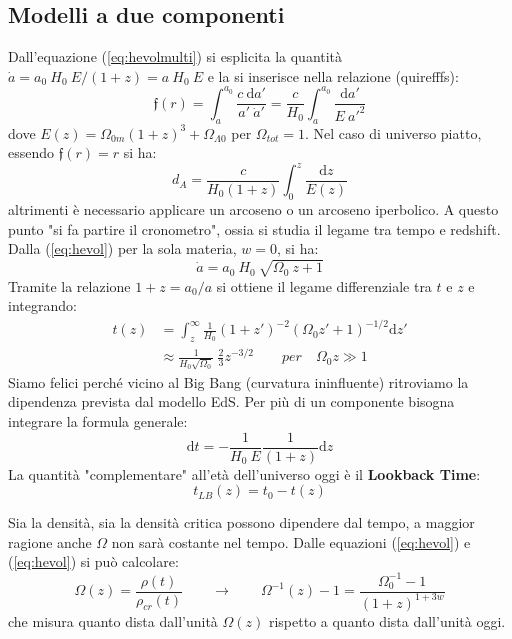 \subsection{Modelli a due componenti}
Dall'equazione (\ref{eq:hevolmulti}) si esplicita la quantità $\dot{a}=a_0 ~H_0 ~E /(1+z) = a ~H_0 ~E$ e la si inserisce nella relazione (quirefffs):
\begin{equation}
    \mathfrak{f}(r) = \int_{a}^{a_0} \frac{c ~\mathrm{d}a'}{a' ~\dot{a}'} = \frac{c}{H_0} \int_{a}^{a_0} \frac{\mathrm{d}a'}{E ~a'^2}
\end{equation}
dove $E(z) = \Omega_{0m}(1+z)^3 + \Omega_{\Lambda 0}$ per $\Omega_{tot}=1$. Nel caso di universo piatto, essendo $\mathfrak{f}(r)=r$ si ha:
\begin{equation}
    d_A = \frac{c}{H_0 (1+z)} \int^z_0 \frac{\mathrm{d}z}{E(z)}
\end{equation}
altrimenti è necessario applicare un arcoseno o un arcoseno iperbolico. A questo punto "si fa partire il cronometro", ossia si studia il legame tra tempo e redshift. Dalla (\ref{eq:hevol}) per la sola materia, $w=0$, si ha:
\begin{equation}
\dot{a}=a_0~H_0~\sqrt{\Omega_0 ~z +1} \label{eq:adotsolamateria}
\end{equation}
Tramite la relazione $1+z=a_0/a$ si ottiene il legame differenziale tra $t$ e $z$ e integrando:
\begin{align}
    t(z) &=\int_z^\infty \frac{1}{H_0}(1+z')^{-2}(\Omega_0 z'+1)^{-1/2}\mathrm{d}z' \\
    & \approx  \frac{1}{H_0 \sqrt{\Omega_0}}~\frac{2}{3} z^{-3/2} \qquad per\quad \Omega_0 z \gg 1
\end{align}
Siamo felici perché vicino al Big Bang (curvatura ininfluente) ritroviamo la dipendenza prevista dal modello EdS. Per più di un componente bisogna integrare la formula generale:
\begin{equation}
    \mathrm{d}t = - \frac{1}{H_0 ~E}\frac{1}{(1+z)}\mathrm{d}z
\end{equation}
La quantità "complementare" all'età dell'universo oggi è il \textbf{Lookback Time}:
$$
t_{LB}(z) = t_0 - t(z)
$$

Sia la densità, sia la densità critica possono dipendere dal tempo, a maggior ragione anche $\Omega$ non sarà costante nel tempo. Dalle equazioni (\ref{eq:hevol}) e (\ref{eq:hevol}) si può calcolare:
\begin{equation*}
    \Omega(z) = \frac{\rho(t)}{\rho_{cr}(t)} \qquad\rightarrow \qquad \Omega^{-1}(z) -1 = \frac{\Omega_0^{-1}-1}{(1+z)^{1+3w}}
\end{equation*}
che misura quanto dista dall'unità $\Omega (z)$ rispetto a quanto dista dall'unità oggi.


